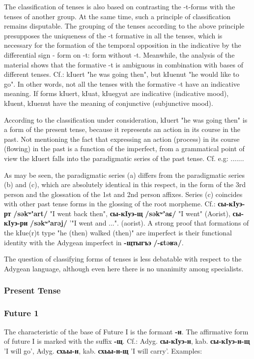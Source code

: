 \documentclass[a4paper,12pt]{book}
\newcommand{\1}[1]{\textbf{\emph{#1}}} %
\newcommand{\2}[1]{\textbf{[#1]}} %
\newcommand{\3}[1]{\fontsize{11pt}{0cm}\textbf{\emph{#1}}} %
\newcommand{\4}[1]{\fontsize{10pt}{0cm}\emph{#1}}	%
\newcommand{\5}[1]{\textbf{/#1/}} %
\newcommand{\6}[1]{\textbf{[#1]}} %
\newcommand{\7}[1]{\fontsize{12pt}{0cm}\emph{#1}} %
\newcommand{\8}[1]{\fontsize{12pt}{0cm}`#1'} %
\newcommand{\9}[1]{\fontsize{12pt}{0cm}(lit. `#1')} %
\newcommand{\glossphonemics}[1]{\textbf{/#1/}} %
\begin{document}
The classification of tenses is also based on contrasting the -t-forms with the tenses of another group. At the same time, such a principle of classification remains disputable. The grouping of the tenses according to the above principle presupposes the uniqueness of the -t formative in all the tenses, which is necessary for the formation of the temporal opposition in the indicative by the differential sign - form on -t: form without -t. Meanwhile, the analysis of the material shows that the formative -t is ambiguous in combination with bases of different tenses. Cf.: kIuert "he was going then", but kIuenut "he would like to go". In other words, not all the tenses with the formative -t have an indicative meaning. If forms kIuert, kIuat, kIuegyat are indicative (indicative mood), kIuent, kIuenut have the meaning of conjunctive (subjunctive mood).

According to the classification under consideration, kIuert "he was going then" is a form of the present tense, because it represents an action in its course in the past. Not mentioning the fact that expressing an action (process) in its course (flowing) in the past is a function of the imperfect, from a grammatical point of view the kIuert falls into the paradigmatic series of the past tense. Cf. e.g:
.......

As may be seen, the paradigmatic series (a) differs from the paradigmatic series (b) and (c), which are absolutely identical in this respect, in the form of the 3rd person and the glossation of the 1st and 2nd person affixes. Series (c) coincides with other past tense forms in the glossing of the root morpheme. Cf.: \textbf{сы-кIуэ-рт} \glossphonemics{səkʷʼart} "I went back then", \textbf{сы-кIуэ-щ} \glossphonemics{səkʷʼaɕ} "I went" (Aorist), \textbf{сы-кIуэ-ри} \glossphonemics{səkʷʼarəj} '"I went and ...". (aorist). A strong proof that formations of the kIue(r)t type "he (then) walked (then)" are imperfect is their functional identity with the Adygean imperfect in \textbf{-щтыгъэ} \glossphonemics{-ɕtəʁa}.

The question of classifying forms of tenses is less debatable with respect to the Adygean language, although even here there is no unanimity among specialists.
\subsubsection{Present Tense}
\subsubsection{Future 1}
The characteristic of the base of Future I is the formant \textbf{-н}. The affirmative form of future I is marked with the suffix \textbf{-щ}. Cf.: Adyg. \textbf{сы-кIуэ-н}, kab. \textbf{сы-кIуэ-н-щ} 'I will go', Adyg. \textbf{схьы-н}, kab. \textbf{схьы-н-щ} 'I will carry'. Examples:
\end{document}
